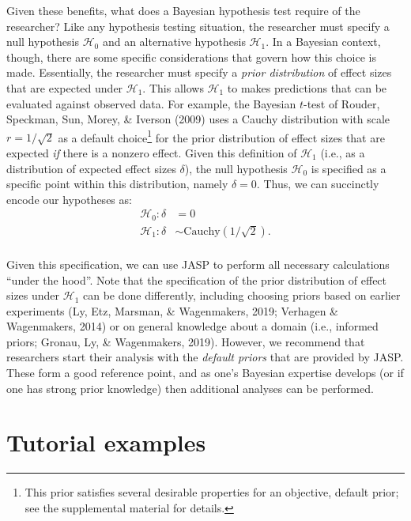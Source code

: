 \documentclass[english,,doc,floatsintext]{apa6}
\let\rmarkdownfootnote\footnote%
\def\footnote{\protect\rmarkdownfootnote}
\begin{document}
Given these benefits, what does a Bayesian hypothesis test require of the researcher? Like any hypothesis testing situation, the researcher must specify a null hypothesis \(\mathcal{H}_0\) and an alternative hypothesis \(\mathcal{H}_1\). In a Bayesian context, though, there are some specific considerations that govern how this choice is made. Essentially, the researcher must specify a \emph{prior distribution} of effect sizes that are expected under \(\mathcal{H}_1\). This allows \(\mathcal{H}_1\) to makes predictions that can be evaluated against observed data. For example, the Bayesian \(t\)-test of Rouder, Speckman, Sun, Morey, \& Iverson (2009) uses a Cauchy distribution with scale \(r=1/\sqrt{2}\) as a default choice\footnote{This prior satisfies several desirable properties for an objective, default prior; see the supplemental material for details.} for the prior distribution of effect sizes that are expected \emph{if} there is a nonzero effect. Given this definition of \(\mathcal{H}_1\) (i.e., as a distribution of expected effect sizes \(\delta\)), the null hypothesis \(\mathcal{H}_0\) is specified as a specific point within this distribution, namely \(\delta=0\). Thus, we can succinctly encode our hypotheses as:
\begin{align*}
\mathcal{H}_0: \delta &=0\\
\mathcal{H}_1: \delta &\sim \text{Cauchy}(1/\sqrt{2}).\\
\end{align*}

Given this specification, we can use JASP to perform all necessary calculations \enquote{under the hood}. Note that the specification of the prior distribution of effect sizes under \(\mathcal{H}_1\) can be done differently, including choosing priors based on earlier experiments (Ly, Etz, Marsman, \& Wagenmakers, 2019; Verhagen \& Wagenmakers, 2014) or on general knowledge about a domain (i.e., informed priors; Gronau, Ly, \& Wagenmakers, 2019). However, we recommend that researchers start their analysis with the \emph{default priors} that are provided by JASP. These form a good reference point, and as one's Bayesian expertise develops (or if one has strong prior knowledge) then additional analyses can be performed.

\hypertarget{tutorial-examples}{%
\section{Tutorial examples}\label{tutorial-examples}}
\end{document}
